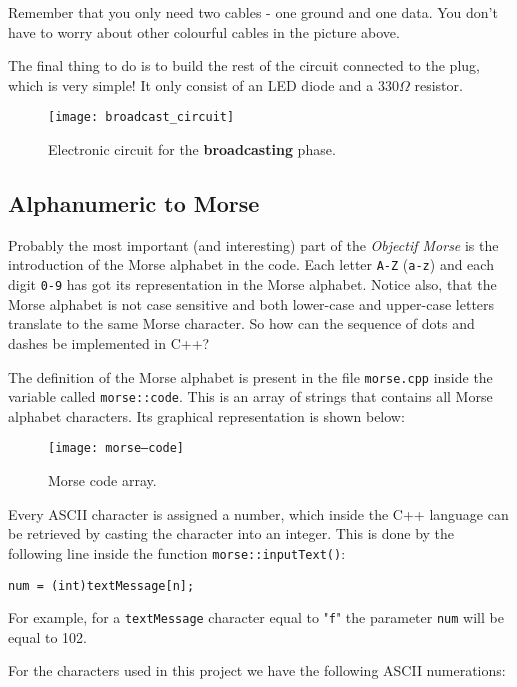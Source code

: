 \documentclass[12pt]{report}
\begin{document}
Remember that you only need two cables - one ground and one data. You don't have to worry about other colourful cables in the picture above.

The final thing to do is to build the rest of the circuit connected to the plug, which is very simple! It only consist of an LED diode and a 330$\Omega$ resistor.

\begin{figure}[H]
\centering\texttt{[image: broadcast\_circuit]}
\caption{Electronic circuit for the \textbf{broadcasting} phase.}				
\label{fig:broadcast_circuit}
\end{figure}

\subsection{Alphanumeric to Morse} \label{sec:asciitomorse}

Probably the most important (and interesting) part of the \textit{Objectif Morse} is the introduction of the Morse alphabet in the code. Each letter \verb|A-Z| (\verb|a-z|) and each digit \verb|0-9| has got its representation in the Morse alphabet. Notice also, that the Morse alphabet is not case sensitive and both lower-case and upper-case letters translate to the same Morse character. So how can the sequence of dots and dashes be implemented in C++?

The definition of the Morse alphabet is present in the file \verb|morse.cpp| inside the variable called \verb|morse::code|. This is an array of strings that contains all Morse alphabet characters. Its graphical representation is shown below:

\begin{figure}[H]
\centering\texttt{[image: morse--code]}
\caption{Morse code array.}				
\label{fig:morse_code_array}
\end{figure}

Every ASCII character is assigned a number, which inside the C++ language can be retrieved by casting the character into an integer. This is done by the following line inside the function \verb|morse::inputText()|: 

\begin{lstlisting}
num = (int)textMessage[n];
\end{lstlisting}

For example, for a \verb|textMessage| character equal to "\verb|f|" the parameter \verb|num| will be equal to 102.

For the characters used in this project we have the following ASCII numerations:
\end{document}
